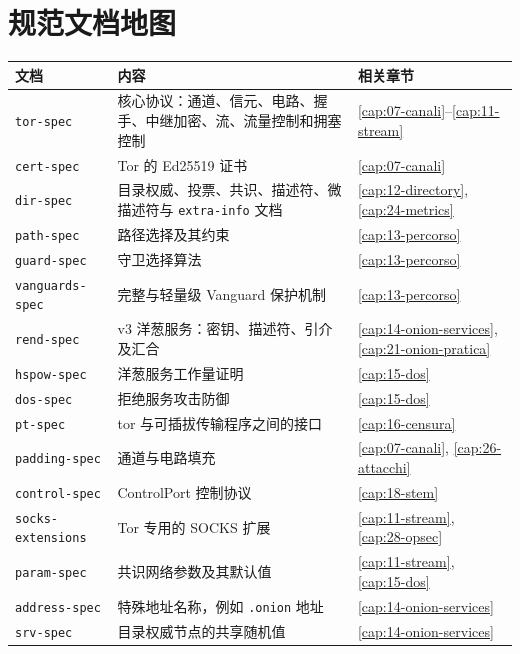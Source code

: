 \section{规范文档地图}\label{sec:C-mappa}

\begin{center}\small
\begin{tabularx}{\textwidth}{@{}l>{\raggedright\arraybackslash}Xl@{}}
\toprule
文档 & 内容 & 相关章节 \\
\midrule
\texttt{tor-spec} & 核心协议：通道、信元、电路、握手、中继加密、流、流量控制和拥塞控制 & \ref{cap:07-canali}--\ref{cap:11-stream} \\
\texttt{cert-spec} & Tor 的 Ed25519 证书 & \ref{cap:07-canali} \\
\texttt{dir-spec} & 目录权威、投票、共识、描述符、微描述符与 \texttt{extra-info} 文档 & \ref{cap:12-directory}, \ref{cap:24-metrics} \\
\texttt{path-spec} & 路径选择及其约束 & \ref{cap:13-percorso} \\
\texttt{guard-spec} & 守卫选择算法 & \ref{cap:13-percorso} \\
\texttt{vanguards-spec} & 完整与轻量级 Vanguard 保护机制 & \ref{cap:13-percorso} \\
\texttt{rend-spec} & v3 洋葱服务：密钥、描述符、引介及汇合 & \ref{cap:14-onion-services}, \ref{cap:21-onion-pratica} \\
\texttt{hspow-spec} & 洋葱服务工作量证明 & \ref{cap:15-dos} \\
\texttt{dos-spec} & 拒绝服务攻击防御 & \ref{cap:15-dos} \\
\texttt{pt-spec} & tor 与可插拔传输程序之间的接口 & \ref{cap:16-censura} \\
\texttt{padding-spec} & 通道与电路填充 & \ref{cap:07-canali}, \ref{cap:26-attacchi} \\
\texttt{control-spec} & ControlPort 控制协议 & \ref{cap:18-stem} \\
\texttt{socks-extensions} & Tor 专用的 SOCKS 扩展 & \ref{cap:11-stream}, \ref{cap:28-opsec} \\
\texttt{param-spec} & 共识网络参数及其默认值 & \ref{cap:11-stream}, \ref{cap:15-dos} \\
\texttt{address-spec} & 特殊地址名称，例如 \texttt{.onion} 地址 & \ref{cap:14-onion-services} \\
\texttt{srv-spec} & 目录权威节点的共享随机值 & \ref{cap:14-onion-services} \\
\bottomrule
\end{tabularx}
\end{center}

